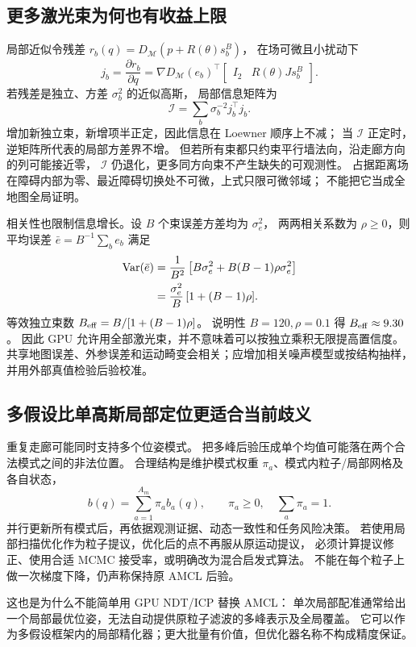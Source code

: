 \subsection{更多激光束为何也有收益上限}
局部近似令残差
$r_b(q)=D_{\mathcal M}(p+R(\theta)s_b^B)$，
在场可微且小扰动下
\begin{equation}
j_b=\frac{\partial r_b}{\partial q}
=\nabla D_{\mathcal M}(e_b)^\top
\begin{bmatrix}I_2&R(\theta)Js_b^B\end{bmatrix}.
\label{eq:locjac}
\end{equation}
若残差是独立、方差 $\sigma_b^2$ 的近似高斯，
局部信息矩阵为
\[
\mathcal I=\sum_b \sigma_b^{-2}j_b^\top j_b.
\]
增加新独立束，新增项半正定，因此信息在 Loewner 顺序上不减；
当 $\mathcal I$ 正定时，逆矩阵所代表的局部方差界不增。
但若所有束都只约束平行墙法向，沿走廊方向的列可能接近零，
$\mathcal I$ 仍退化，更多同方向束不产生缺失的可观测性。
占据距离场在障碍内部为零、最近障碍切换处不可微，上式只限可微邻域；
不能把它当成全地图全局证明。

相关性也限制信息增长。设 $B$ 个束误差方差均为 $\sigma_e^2$，
两两相关系数为 $\rho\ge0$，则平均误差
$\bar e=B^{-1}\sum_be_b$ 满足
\begin{align}
\operatorname{Var}(\bar e)
&=\frac1{B^2}\left[B\sigma_e^2+B(B-1)\rho\sigma_e^2\right]\\
&=\frac{\sigma_e^2}{B}\,[1+(B-1)\rho].
\end{align}
等效独立束数
$B_{\rm eff}=B/[1+(B-1)\rho]$。
说明性 $B=120,\rho=0.1$ 得 $B_{\rm eff}\approx9.30$。
因此 GPU 允许用全部激光束，并不意味着可以按独立乘积无限提高置信度。
共享地图误差、外参误差和运动畸变会相关；应增加相关噪声模型或按结构抽样，
并用外部真值检验后验校准。

\subsection{多假设比单高斯局部定位更适合当前歧义}
重复走廊可能同时支持多个位姿模式。
把多峰后验压成单个均值可能落在两个合法模式之间的非法位置。
合理结构是维护模式权重 $\pi_a$、模式内粒子/局部网格及各自状态，
\[
b(q)=\sum_{a=1}^{A_m}\pi_a b_a(q),\qquad
\pi_a\ge0,\quad\sum_a\pi_a=1.
\]
并行更新所有模式后，再依据观测证据、动态一致性和任务风险决策。
若使用局部扫描优化作为粒子提议，优化后的点不再服从原运动提议，
必须计算提议修正、使用合适 MCMC 接受率，或明确改为混合启发式算法。
不能在每个粒子上做一次梯度下降，仍声称保持原 AMCL 后验。

这也是为什么不能简单用 GPU NDT/ICP 替换 AMCL：
单次局部配准通常给出一个局部最优位姿，无法自动提供原粒子滤波的多峰表示及全局覆盖。
它可以作为多假设框架内的局部精化器；更大批量有价值，但优化器名称不构成精度保证。
